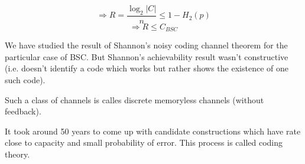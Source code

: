 \documentclass{article}
\begin{document}
$$ \Rightarrow R= \frac{\log_2 |C|}{n} \leq 1- H_2 (p)$$
$$ \Rightarrow R \leq C_{BSC}$$

We have studied the result of Shannon's noisy coding channel theorem for the particular case of BSC. But Shannon's achievability result wasn't constructive (i.e. doesn't identify a code which works but rather shows the existence of one such code).

Such a class of channels is calles discrete memoryless channels (without feedback).

It took around 50 years to come up with candidate constructions which have rate close to capacity and small probability of error. This process is called coding theory.
\end{document}
